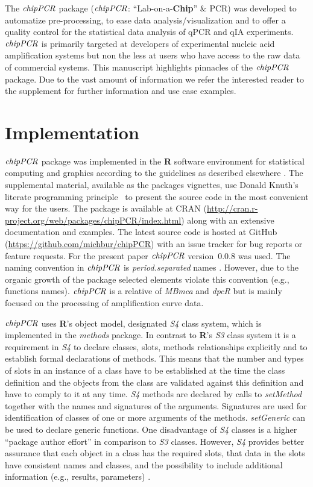 \documentclass[twocolumn]{bmcart}%
\begin{document}
The $\emph{chipPCR}$ package ($\emph{chipPCR}$: ``Lab-on-a-\textbf{Chip}'' \& 
PCR) was developed to automatize pre-processing, to ease data 
analysis/visualization and to offer a quality control for the statistical data 
analysis of qPCR and qIA experiments. $\emph{chipPCR}$ is primarily targeted at 
developers of experimental nucleic acid amplification systems but non the less 
at users who have access to the raw data of commercial systems. This manuscript
highlights pinnacles of the $\emph{chipPCR}$ package. Due to the vast 
amount of information we refer the interested reader to the supplement for further 
information and use case examples.

\section*{Implementation}

$\emph{chipPCR}$ package was implemented in the \textbf{R} software environment 
for statistical computing and graphics according to the guidelines as described 
elsewhere \cite{RDCT2014a}. The supplemental material, available as the 
packages vignettes, use Donald Knuth's literate programming 
principle~\cite{Knuth1984} to present the source code in the most convenient way 
for the users. The package is available at CRAN 
(\url{http://cran.r-project.org/web/packages/chipPCR/index.html}) along with an 
extensive documentation and examples. The latest source code is hosted at GitHub 
(\url{https://github.com/michbur/chipPCR}) with an issue tracker for bug reports 
or feature requests. For the present paper $\emph{chipPCR}$ version~0.0.8 was 
used. The naming convention in $\emph{chipPCR}$ is \textit{period.separated} 
names \cite{Baaaath_2012}. However, due to the organic growth of the package  
selected elements violate this convention (e.g., functions names). 
$\emph{chipPCR}$ is a relative of \emph{MBmca} \cite{roediger_RJ_2013} and 
\emph{dpcR} but is mainly focused on the processing of amplification curve data.

  $\emph{chipPCR}$ uses \textbf{R}’s object model, designated \emph{S4} class 
system, which is implemented in the \emph{methods} package. In contrast to 
\textbf{R}’s \emph{S3} class system it is a requirement in \emph{S4} to declare 
classes, slots, methods relationships explicitly and to establish formal 
declarations of methods. This means that the number and types of slots in an 
instance of a class have to be established at the time the class definition and 
the objects from the class are validated against this definition and have to 
comply to it at any time. \emph{S4} methods are declared by calls to 
\textsl{setMethod} together with the names and signatures of the arguments. 
Signatures are used for identification of classes of one or more arguments of 
the methods. \textsl{setGeneric} can be used to declare generic functions. One 
disadvantage of \emph{S4} classes is a higher ``package author effort'' in 
comparison to \emph{S3} classes. However, \emph{S4} provides better assurance 
that each object in a class has the required slots, that data in the slots have 
consistent names and classes, and the possibility to include additional 
information (e.g., results, parameters) \cite{Karatzoglou_2004}.
\end{document}
